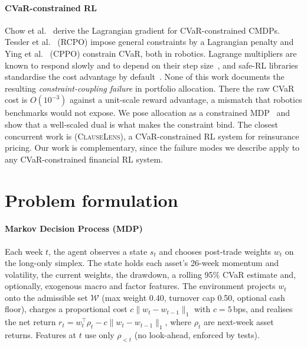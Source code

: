 \documentclass[sigconf]{acmart}
\begin{document}
\paragraph{CVaR-constrained RL}
Chow et al.~\cite{chow2018riskconstrained} derive the Lagrangian gradient for CVaR-constrained
CMDPs. Tessler et al.~\cite{tessler2019rcpo} (RCPO) impose general constraints by a
Lagrangian penalty and Ying et al.~\cite{ying2022cppo} (CPPO) constrain CVaR, both in robotics. Lagrange multipliers are known to
respond slowly and to depend on their step size~\cite{stooke2020pid}, and safe-RL libraries
standardise the cost advantage by default~\cite{ji2024omnisafe}. None of this work documents
the resulting \emph{constraint-coupling failure} in portfolio allocation. There the raw CVaR
cost is $O(10^{-3})$ against a unit-scale reward advantage, a mismatch that robotics benchmarks
would not expose. We pose allocation as a constrained MDP~\cite{altman1999cmdp,achiam2017cpo} and show that a
well-scaled dual is what makes the constraint bind. The closest concurrent work is
\citet{dong2025clauselens} (\textsc{ClauseLens}), a CVaR-constrained RL system for
reinsurance pricing. Our work is complementary, since the failure modes we describe apply to
any CVaR-constrained financial RL system.

\section{Problem formulation}
\label{sec:formulation}

\paragraph{Markov Decision Process (MDP)} Each week $t$, the agent observes a state $s_t$ and chooses
post-trade weights $w_t$ on the long-only simplex. The state holds each asset's 26-week momentum
and volatility, the current weights, the drawdown, a rolling 95\% CVaR estimate and, optionally,
exogenous macro and factor features. The environment projects $w_t$ onto the admissible set
$\mathcal{W}$ (max weight 0.40, turnover cap 0.50, optional cash floor), charges a proportional
cost $c\lVert w_t - w_{t-1}\rVert_1$ with $c=5$\,bps, and realises the net return
$r_t = w_t^{\top}\rho_t - c\lVert w_t - w_{t-1}\rVert_1$, where $\rho_t$ are next-week asset
returns. Features at $t$ use only $\rho_{<t}$ (no look-ahead, enforced by
tests).
\end{document}

